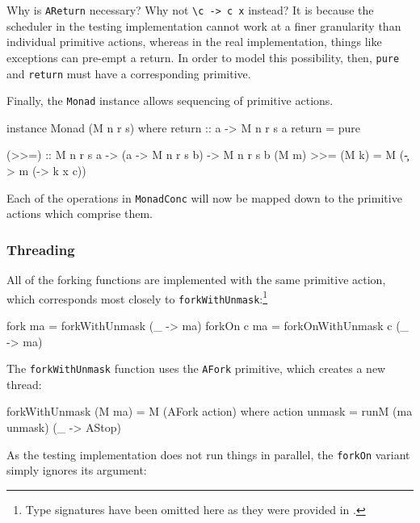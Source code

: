 
Why is \verb|AReturn| necessary? Why not \verb|\c -> c x| instead? It
is because the scheduler in the testing implementation cannot work at
a finer granularity than individual primitive actions, whereas in the
real implementation, things like exceptions can pre-empt a return. In
order to model this possibility, then, \verb|pure| and \verb|return|
must have a corresponding primitive.

Finally, the \verb|Monad| instance allows sequencing of primitive actions.

\begin{haskellcode}
instance Monad (M n r s) where
  return :: a -> M n r s a
  return = pure

  (>>=) :: M n r s a -> (a -> M n r s b) -> M n r s b
  (M m) >>= (M k) = M (\c -> m (\x -> k x c))
\end{haskellcode}

Each of the operations in \verb|MonadConc| will now be mapped down to
the primitive actions which comprise them.

\subsubsection{Threading}
\label{sec:execution-primops-threading}

All of the forking functions are implemented with the same primitive
action, which corresponds most closely to
\verb|forkWithUnmask|:\footnote{Type signatures have been omitted here
  as they were provided in .}

\begin{haskellcode}
fork     ma = forkWithUnmask     (\_ -> ma)
forkOn c ma = forkOnWithUnmask c (\_ -> ma)
\end{haskellcode}

The \verb|forkWithUnmask| function uses the \verb|AFork| primitive,
which creates a new thread:

\begin{haskellcode}
forkWithUnmask (M ma) = M (AFork action) where
  action unmask = runM (ma unmask) (\_ -> AStop)
\end{haskellcode}


As the testing implementation does not run things in parallel, the
\verb|forkOn| variant simply ignores its argument:

